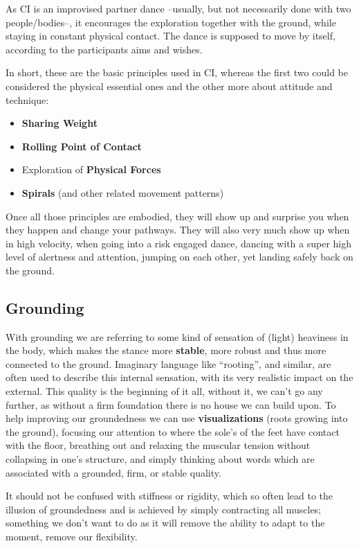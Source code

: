 As CI is an improvised partner dance --usually, but not necessarily done with two people/bodies--, it encourages the exploration together with the ground, while staying in constant physical contact.
The dance is supposed to move by itself, according to the participants aims and wishes.

In short, these are the basic principles used in CI, whereas the first two could be considered the physical essential ones and the other more about attitude and technique:

\begin{itemize}
    \item \textbf{Sharing Weight}
    \item \textbf{Rolling Point of Contact}
    \item Exploration of \textbf{Physical Forces}
    \item \textbf{Spirals} (and other related movement patterns)
\end{itemize}

Once all those principles are embodied, they will show up and surprise you when they happen and change your pathways.
They will also very much show up when in high velocity, when going into a risk engaged dance, dancing with a super high level of alertness and attention, jumping on each other, yet landing safely back on the ground.

\subsection{Grounding}\label{subsec:grounding}

With grounding we are referring to some kind of sensation of (light) heaviness in the body, which makes the stance more \textbf{stable}, more robust and thus more connected to the ground.
Imaginary language like ``rooting'', and similar, are often used to describe this internal sensation, with its very realistic impact on the external.
This quality is the beginning of it all, without it, we can't go any further, as without a firm foundation there is no house we can build upon.
To help improving our groundedness we can use \textbf{visualizations} (roots growing into the ground), focusing our attention to where the sole's of the feet have contact with the floor, breathing out and relaxing the muscular tension without collapsing in one's structure, and simply thinking about words which are associated with a grounded, firm, or stable quality.

It should not be confused with stiffness or rigidity, which so often lead to the illusion of groundedness and is achieved by simply contracting all muscles; something we don't want to do as it will remove the ability to adapt to the moment, remove our flexibility.

